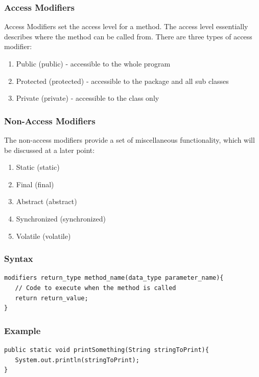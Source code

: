 \documentclass[a4paper]{article}
\begin{document}
\subsubsection*{Access Modifiers}

Access Modifiers set the access level for a method. The access level essentially describes where the method can be called from. There are three types of access modifier:

\begin{enumerate}

\item Public (public) - accessible to the whole program
\item Protected (protected) - accessible to the package and all sub classes
\item Private (private) - accessible to the class only 

\end{enumerate}

\subsubsection*{Non-Access Modifiers}
The non-access modifiers provide a set of miscellaneous functionality, which will be discussed at a later point:

\begin{enumerate}
\item Static (static)
\item Final (final)
\item Abstract (abstract)
\item Synchronized (synchronized)
\item Volatile (volatile)
\end{enumerate}


\subsubsection*{Syntax}
\begin{lstlisting}
modifiers return_type method_name(data_type parameter_name){
   // Code to execute when the method is called
   return return_value;
}
\end{lstlisting}

\subsubsection*{Example}
\begin{lstlisting}
public static void printSomething(String stringToPrint){
   System.out.println(stringToPrint);
}
\end{lstlisting}
\end{document}

